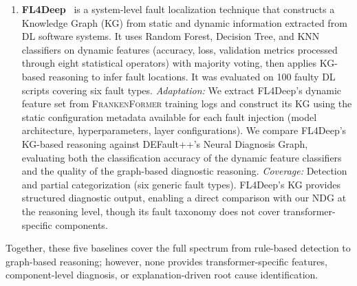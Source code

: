 \begin{enumerate}[label=(\roman*),nosep]
\item \textbf{FL4Deep}~\cite{fl4deep} is a system-level fault localization technique that constructs a Knowledge Graph (KG) from static and dynamic information extracted from DL software systems. It uses Random Forest, Decision Tree, and KNN classifiers on dynamic features (accuracy, loss, validation metrics processed through eight statistical operators) with majority voting, then applies KG-based reasoning to infer fault locations. It was evaluated on 100 faulty DL scripts covering six fault types. \emph{Adaptation:} We extract FL4Deep's dynamic feature set from \textsc{FrankenFormer} training logs and construct its KG using the static configuration metadata available for each fault injection (model architecture, hyperparameters, layer configurations). We compare FL4Deep's KG-based reasoning against DEFault++'s Neural Diagnosis Graph, evaluating both the classification accuracy of the dynamic feature classifiers and the quality of the graph-based diagnostic reasoning. \emph{Coverage:} Detection and partial categorization (six generic fault types). FL4Deep's KG provides structured diagnostic output, enabling a direct comparison with our NDG at the reasoning level, though its fault taxonomy does not cover transformer-specific components.
\end{enumerate}

Together, these five baselines cover the full spectrum from rule-based detection to graph-based reasoning; however, none provides transformer-specific features, component-level diagnosis, or explanation-driven root cause identification.

